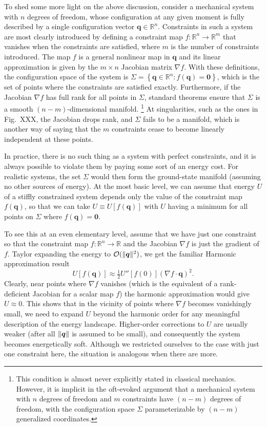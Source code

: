 To shed some more light on the above discussion, consider a mechanical system with $n$ degrees of freedom, whose configuration at any given moment is fully described by a single configuration vector $\bm{q} \in \mathbb{R}^{n}$.
Constraints in such a system are most clearly introduced by defining a constraint map $f: \mathbb{R}^{n} \to \mathbb{R}^{m}$
that vanishes when the constraints are satisfied, where $m$ is the number of constraints introduced.
The map $f$ is a general nonlinear map in $\bm{q}$ and its linear approximation is given by the $m\times n$ Jacobian matrix $\nabla f$.
With these definitions, the configuration space of the system is $\Sigma = \left\{\bm{q} \in \mathbb{R}^{n} : f(\bm{q}) = \bm{0}\right\}$, which is the set of points where the constraints are satisfied exactly.
Furthermore, if the Jacobian $\nabla f$ has full rank for all points in $\Sigma$, standard theorems ensure that $\Sigma$ is a smooth $(n-m)$-dimensional manifold.%
\footnote{This condition is almost never explicitly stated in classical mechanics.
However, it is implicit in the oft-evoked argument that a mechanical system with $n$ degrees of freedom and $m$ constraints have $(n-m)$ degrees of freedom, with the configuration space $\Sigma$ parameterizable by $(n-m)$ generalized coordinates.}
At singularities, such as the ones in Fig.~XXX, the Jacobian drops rank, and $\Sigma$ fails to be a manifold,
which is another way of saying that the $m$ constraints cease to become linearly independent at these points.

In practice, there is no such thing as a system with perfect constraints, and it is always possible to violate them by paying some sort of an energy cost.
For realistic systems, the set $\Sigma$ would then form the ground-state manifold (assuming no other sources of energy).
At the most basic level, we can assume that energy $U$ of a stiffly constrained system depends only the value of the constraint map $f(\bm{q})$, so that we can take $U \equiv U[f(\bm{q})]$ with $U$ having a minimum for all points on $\Sigma$ where $f(\bm{q}) = \bm{0}$.

To see this at an even elementary level, assume that we have just one constraint so that the constraint map $f: \mathbb{R}^{n} \to \mathbb{R}$ and the Jacobian $\nabla f$ is just the gradient of $f$.
Taylor expanding the energy to $\mathcal{O}(\lVert\bm{q}\rVert^{2})$, we get the familiar Harmonic approximation result
%
\begin{equation}
  U[f(\bm{q})] \approx \tfrac{1}{2}U''\left[f(0)\right]\left(\nabla f\cdot \bm{q}\right)^{2}.
\end{equation}
%
Clearly, near points where $\nabla f$ vanishes (which is the equivalent of a rank-deficient Jacobian for a scalar map $f$) the harmonic approximation would give $U \approx 0$.
This shows that in the vicinity of points where $\nabla f$ becomes vanishingly small, we need to expand $U$ beyond the harmonic order for any meaningful description of the energy landscape.
Higher-order corrections to $U$ are usually weaker (after all $\lVert\bm{q}\rVert$ is assumed to be small), and consequently the system becomes energetically soft.
Although we restricted ourselves to the case with just one constraint here, the situation is analogous when there are more.



